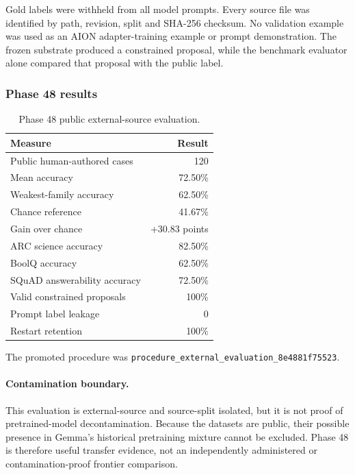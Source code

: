 Gold labels were withheld from all model prompts.  Every source file was
identified by path, revision, split and SHA-256 checksum.  No validation
example was used as an AION adapter-training example or prompt
demonstration.  The frozen substrate produced a constrained proposal, while
the benchmark evaluator alone compared that proposal with the public label.

\subsubsection{Phase 48 results}

\begin{table}[htbp]
\centering
\begin{tabular}{lr}
\hline
\textbf{Measure} & \textbf{Result}\\
\hline
Public human-authored cases & 120\\
Mean accuracy & 72.50\%\\
Weakest-family accuracy & 62.50\%\\
Chance reference & 41.67\%\\
Gain over chance & +30.83 points\\
ARC science accuracy & 82.50\%\\
BoolQ accuracy & 62.50\%\\
SQuAD answerability accuracy & 72.50\%\\
Valid constrained proposals & 100\%\\
Prompt label leakage & 0\\
Restart retention & 100\%\\
\hline
\end{tabular}
\caption{Phase 48 public external-source evaluation.}
\label{tab:phase48-results}
\end{table}

The promoted procedure was
\texttt{procedure\_external\_evaluation\_8e4881f75523}.

\paragraph{Contamination boundary.}
This evaluation is external-source and source-split isolated, but it is not
proof of pretrained-model decontamination.  Because the datasets are public,
their possible presence in Gemma's historical pretraining mixture cannot be
excluded.  Phase 48 is therefore useful transfer evidence, not an
independently administered or contamination-proof frontier comparison.

